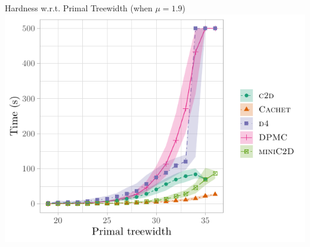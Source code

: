 \documentclass{beamer}
\begin{document}
\begin{frame}{Hardness w.r.t. Primal Treewidth (when $\mu = 1.9$)}
  \centering
  \includegraphics{treewidth2.pdf}
\end{frame}
\end{document}
